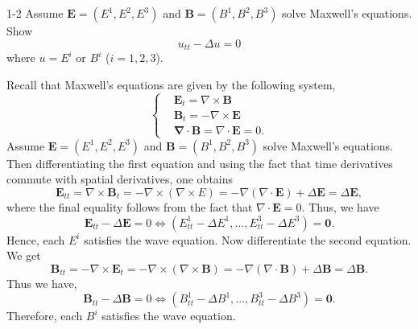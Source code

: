 \documentclass{article}
\numberwithin{equation}{section}
\begin{document}
	\begin{prb}{1-2}
		Assume $\mathbf{E} = (E^{1}, E^{2}, E^{3})$ and $\mathbf{B} = (B^{1}, B^{2}, B^{3})$ solve Maxwell's equations. Show 
		\begin{equation*}
			u_{tt} - \Delta u= 0
		\end{equation*}
		where $u = E^{i}$ or $B^{i}$ ($i = 1, 2, 3$). 
	\end{prb}
	Recall that Maxwell's equations are given by the following system, 
	\begin{equation*}
		\left\{
		\begin{alignedat}{1}
			&\mathbf{E}_{t} = \nabla \times \mathbf{B} \\
			&\mathbf{B}_{t} = -\nabla \times \mathbf{E} \\
			&\mathbf{\nabla} \cdot \mathbf{B}= \nabla \cdot \mathbf{E} =0. 
		\end{alignedat}
		\right.
	\end{equation*}
	Assume $\mathbf{E} = (E^{1}, E^{2}, E^{3})$ and $\mathbf{B} = (B^{1}, B^{2}, B^{3})$ solve Maxwell's equations. Then differentiating the first equation and using the fact that time derivatives commute with spatial derivatives, one obtains 
	\begin{equation*}
		\mathbf{E}_{tt} = \nabla \times \mathbf{B}_{t} = -\nabla \times (\nabla \times E) = -\nabla (\nabla \cdot \mathbf{E}) + \Delta \mathbf{E} = \Delta \mathbf{E}, 
	\end{equation*}
	where the final equality follows from the fact that $\nabla \cdot \mathbf{E} = 0$. Thus, we have 
	\begin{equation*}
		\mathbf{E}_{tt} - \Delta \mathbf{E} = 0 \iff (E^{1}_{tt} - \Delta E^{1}, \ldots, E^{3}_{tt} - \Delta E^{3}) = \mathbf{0}. 
	\end{equation*}
	Hence, each $E^{i}$ satisfies the wave equation. Now differentiate the second equation. We get 
	\begin{equation*}
		\mathbf{B}_{tt} =-\nabla \times \mathbf{E}_{t} = -\nabla \times (\nabla \times \mathbf{B}) = -\nabla (\nabla \cdot \mathbf{B}) + \Delta \mathbf{B} = \Delta \mathbf{B}. 
	\end{equation*}
	Thus we have, 
	\begin{equation*}
		\mathbf{B}_{tt} - \Delta \mathbf{B} = 0 \iff (B^{1}_{tt} - \Delta B^{1}, \ldots, B^{3}_{tt} - \Delta B^{3}) = \mathbf{0}. 
	\end{equation*}
	Therefore, each $B^{i}$ satisfies the wave equation. 
	
\end{document}
